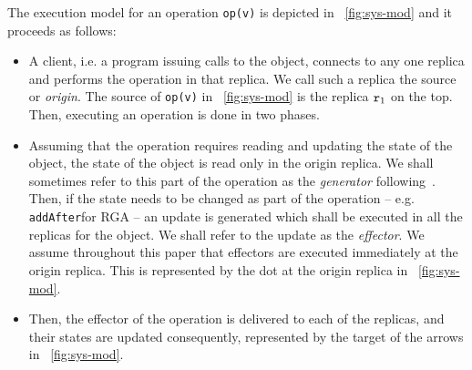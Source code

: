 The execution model for an operation \lstinline|op(v)| is depicted in \figureautorefname~\ref{fig:sys-mod} and it proceeds as follows:
\begin{itemize}
\item A client, i.e. a program issuing calls to the object, connects
  to any one replica %
  and performs the operation in that replica. We call such a
  replica the source or \emph{origin}. The source of \lstinline|op(v)|
  in \figureautorefname~\ref{fig:sys-mod} is the replica $\mathtt{r}_1$ on the top.
  Then, executing an operation is done in two phases.
\item Assuming that the operation requires reading and updating the
  state of the object, the state of the object is read only in the origin replica.
  We shall sometimes refer to this part of the operation as the
  \emph{generator} following~\cite{ShapiroPBZ11}.
  Then, if the state needs to be changed as part of the operation --
  e.g. \lstinline|addAfter|for RGA -- an update is
  generated which shall be executed in all the replicas for the
  object.
  We shall refer to the update as the \emph{effector}.
  We assume throughout this paper that effectors are executed
  immediately at the origin replica.
  This is represented by the dot at the origin replica
  in \figureautorefname~\ref{fig:sys-mod}.
\item Then, the effector of the operation is delivered to each of the
  replicas, and their states are updated consequently, represented by
  the target of the arrows in \figureautorefname~\ref{fig:sys-mod}.
\end{itemize}


